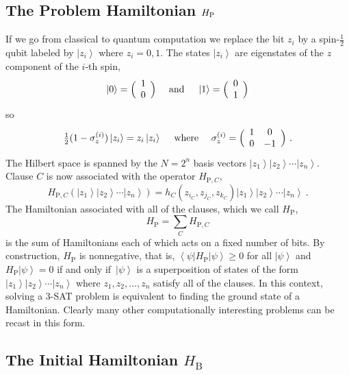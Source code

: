 \documentclass[twoside]{article}
\newcommand{\half}{{\textstyle{\frac12}}}
\newcommand{\ket}[1]{\left|#1\right\rangle}
\newcommand{\bra}[1]{\left\langle#1\right|}
\newcommand{\numEq}[2]{\begin{equation}
   \label{eq:#1}
   #2\end{equation}}
\newcommand{\rP}{{\mathrm{P}}}
\newcommand{\rB}{{\mathrm{B}}}
\newcommand{\ifff}{if and only if}
\numberwithin{equation}{section}
\begin{document}
\subsection{The Problem  Hamiltonian \protect\boldmath$H_{\rm P}$} If
we go from classical to quantum computation we replace the bit $z_i$ by a 
spin-$\half$ qubit labeled by $\ket{z_i }$ where $z_i = 0,1$.   The states
$\ket{ z_i}$ are eigenstates of the $z$ component of the $i$-th spin,
\numEq{1.11}{\ket{0}=\Bigl(\begin{array}{c}1\\0\end{array}\Bigr)
\quad \mbox{ and }\quad
 \ket{1 } = \Bigl(\begin{array}{c}0\\1\end{array}\Bigr)} so
\numEq{1.12}{
\half (1-\sigma^{(i)}_z) \ket{z_i} = z_i\ket{z_i}  
\quad \mbox{ where }\quad 
\sigma^{(i)}_z = \Bigl(\begin{array}{cc}1 & 0\\0 & -1\end{array}\Bigr)\ . }
The Hilbert space is spanned  by the $N=2^n$ basis vectors $\ket{z_1}
\ket{z_2} 
\cdots \ket{z_n}$.  Clause $C$ is now associated with the operator
$H_{\rP,C}$, 
\numEq{1.13}{ H_{\rP,C}(\ket{z_1} \ket{z_2 } \cdots \ket{z_n}) = h_C
(z_{i_C},z_{j_C},z_{k_C})
\ket{z_1} \ket{z_2}\cdots\ket{z_n}\ . } The  Hamiltonian associated with all
of the clauses, which we call $H_\rP$,
\numEq{1.14}{ H_\rP = \sum_C  H_{\rP,C} }
 is the sum of Hamiltonians each of which acts on a fixed number of bits.
By construction, $H_\rP$ is nonnegative, that is,
$\bra{\psi}H_\rP\ket{\psi} \ge 0$ for all
$\ket{\psi}$ and $H_\rP \ket{\psi} = 0$ \ifff\  $\ket{\psi}$ is a
superposition of states of the form
$\ket{z_1}\ket{z_2}\cdots\ket{z_n}$ where $z_1,z_2,\dots,z_n$ satisfy all
of the clauses.  In this context, solving a 3-SAT problem is equivalent to
finding the ground state of a Hamiltonian. Clearly many other
computationally interesting problems can be recast in this form.

\subsection{The Initial Hamiltonian \boldmath$H_\rB$}
\end{document}
